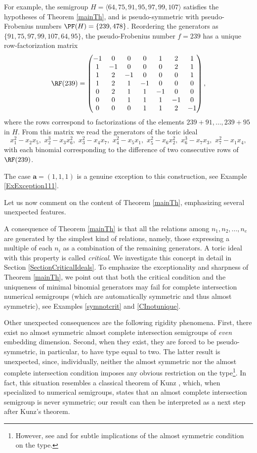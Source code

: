 \documentclass[11pt,twoside]{amsart}
\def\ba{{\mathbf a}}
\theoremstyle{definition}
\numberwithin{equation}{section}
\begin{document}
For example, the semigroup $H = \langle 64,75,91,95,97,99,107\rangle$ satisfies the hypotheses of Theorem \ref{mainTh}, and  
is  pseudo-symmetric with pseudo-Frobenius numbers $\PF(H)=\{239,478\}$. 
Reordering the generators as  $\{91,75,97,99,107,64,95\}$, the pseudo-Frobenius number $f=239$ has a unique row-factorization matrix
$$
\RF(239)=\begin{pmatrix}
-1 & 0 & 0 & 0 & 1 & 2 & 1 \\
1 & -1 & 0 & 0 & 0 & 2 & 1\\
1 & 2 & -1 & 0 & 0 & 0 & 1\\
1 & 2 & 1 & -1 & 0 & 0 & 0\\
0 & 2 & 1 & 1 & -1 & 0 & 0\\
0 & 0 & 1 & 1 & 1 & -1 & 0 \\
0 & 0 & 0 & 1 & 1 & 2 & -1
\end{pmatrix},
$$
where the rows  correspond to factorizations of the elements $239+91, \ldots, 239+95$ in $H$.
From this matrix we read the generators of the toric ideal
$$
 x_1^2 - x_2x_5,\, \,
 x_2^3-x_3x_6^2,\,\,
 x_3^2-x_4x_7,\,\,
 x_4^2-x_5x_1,\,\,
 x_5^2-x_6x_2^2,\,\,
 x_6^3-x_7x_3,\,\,
 x_7^2-x_1x_4,
$$
with  each binomial corresponding to the difference of two consecutive rows of $\RF(239)$.

The case $\ba = (1,1,1) $ is a genuine exception to this construction, see Example \ref{ExException111}.

Let us now comment on the content of Theorem \ref{mainTh}, emphasizing several unexpected features.

A consequence of  Theorem \ref{mainTh} is that all the relations among $n_1, n_2, \ldots, n_e$ are generated by the simplest kind of relations, namely, those expressing a multiple of each $n_i$ as a combination of the remaining generators. 
A toric ideal with this property is called \emph{critical}. 
We investigate this concept in detail in Section \ref{SectionCriticalIdeals}.
To emphasize the exceptionality and  sharpness of  Theorem \ref{mainTh}, we point out that both the critical condition and the uniqueness of minimal binomial generators may fail for complete intersection numerical semigroups (which are automatically symmetric and thus almost symmetric),
see Examples \ref{symnotcrit} and \ref{CInotunique}.


Other unexpected consequences are the following rigidity phenomena.
First, there exist no almost symmetric almost complete intersection semigroups of \emph{even} embedding dimension.
Second, when they exist, they are forced to be pseudo-symmetric, in particular, to have type equal to two.
The latter result is unexpected, since, individually, neither
the almost symmetric nor the almost complete intersection condition imposes any obvious restriction on the type\footnote{However, see \cite[Question 13]{Mo} and \cite[Section 5]{MS} for subtle implications of the almost symmetric condition on the type.}. 
In fact, 
this situation resembles a classical theorem of Kunz \cite{Ku74}, 
which, when specialized to numerical semigroups, 
states that  an almost complete intersection semigroup is never symmetric;
our result can then be interpreted as a next step after Kunz's theorem.
\end{document}

